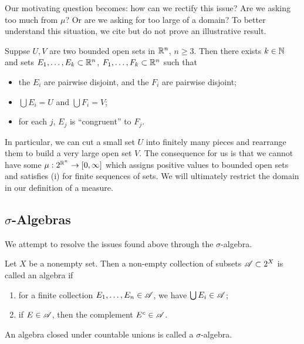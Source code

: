\documentclass[12pt]{article} %
\begin{document}
Our motivating question becomes: how can we rectify this issue? Are we asking too much from $\mu$? Or are we asking for too large of a domain? To better understand this situation, we cite but do not prove an illustrative result.

\begin{theorem}
    Suppse $U, V$ are two bounded open sets in $\mathbb{R}^n$, $n \geq 3$. Then there exists $k
    \in \mathbb{N}$ and sets $E_1, \ldots, E_k \subset \mathbb{R}^n$, $F_1, \ldots, F_k \subset \mathbb{R}^n$ such that \begin{itemize}
        \item the $E_i$ are pairwise disjoint, and the $F_i$ are pairwise disjoint;
        \item $\bigcup E_i = U$ and $\bigcup F_i = V$;
        \item for each $j$, $E_j$ is ``congruent'' to $F_j$.
    \end{itemize}
\end{theorem}

\noindent In particular, we can cut a small set $U$ into finitely many pieces and rearrange them to build a very large open set $V$. The consequence for us is that we cannot have some $\mu : 2^{\mathbb{R}^n} \to [0,\infty]$ which assigns positive values to bounded open sets and satisfies (i) for finite sequences of sets. We will ultimately restrict the domain in our definition of a measure.

\subsection{$\sigma$-Algebras}

We attempt to resolve the issues found above through the $\sigma$-algebra.

\begin{definition}[Algebra]
    Let $X$ be a nonempty set. Then a non-empty collection of subsets $\mathscr{A} \subset 2^X$ is called an algebra if \begin{enumerate}
        \item for a finite collection $E_1, \ldots, E_n \in \mathscr{A}$, we have $\bigcup E_i \in \mathscr{A}$;
        \item if $E \in \mathscr{A}$, then the complement $E^c \in \mathscr{A}$.
    \end{enumerate}
\end{definition}

\begin{definition}
    An algebra closed under countable unions is called a $\sigma$-algebra.
\end{definition}
\end{document}
